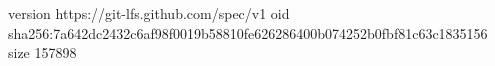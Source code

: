 version https://git-lfs.github.com/spec/v1
oid sha256:7a642dc2432c6af98f0019b58810fe626286400b074252b0fbf81c63c1835156
size 157898
